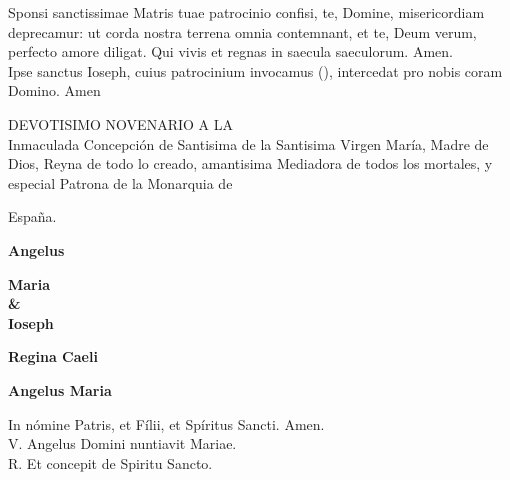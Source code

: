 \documentclass[letterpaper, landscape, 10pt, twocolumn]{article}
\begin{document}
  \noindent
  {\color{red} S}ponsi sanctissimae Matris tuae patrocinio confisi, te, Domine, misericordiam deprecamur: ut corda nostra terrena omnia contemnant, et te, Deum verum, perfecto amore diligat. Qui vivis et regnas in saecula saeculorum. {\color{red} A}men.\\

  \noindent
  {\color{red} I}pse sanctus Ioseph, cuius patrocinium invocamus {\color{red} (\large \maltese)}, intercedat pro nobis coram Domino. {\color{red} A}men
  \vfill

	\huge DEVOTISIMO NOVENARIO A LA\\ Inmaculada Concepci\'on de Santisima de la Santisima Virgen Mar\'ia, Madre de Dios, Reyna de todo lo creado, amantisima Mediadora de todos los mortales, y especial Patrona de la Monarquia de
	\begin{center}
	Espa\~na.
	\end{center}

  \vspace*{3cm}
  \begin{center}
    {\fontsize{50pt}{60pt}\selectfont \textbf{Angelus}}\\
  \end{center}

  \begin{center}
    {\fontsize{30pt}{36pt}\selectfont \textbf{Maria\\ \&\\ Ioseph}}\\
  \end{center}

  \vspace{2cm}
  \begin{center}
    {\fontsize{50pt}{60pt}\selectfont \textbf{Regina Caeli}}\\
  \end{center}
  \clearpage

  \begin{center}
    {\fontsize{50pt}{60pt}\selectfont \textbf{Angelus Maria}}\\
  \end{center}
  \vspace{1cm}

  \noindent
  \Large {\color{red} I}n nómine Patris, et Fílii, et Spíritus Sancti. {\color{red} A}men.\\

  \noindent
  \normalsize
  {\color{red} V. A}ngelus Domini nuntiavit Mariae.\\
  {\color{red} R. E}t concepit de Spiritu Sancto.\\
\end{document}
